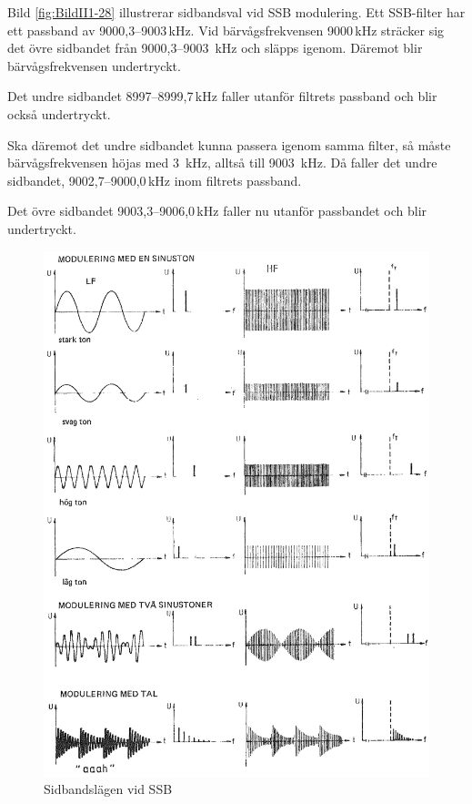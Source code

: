 Bild \ref{fig:BildII1-28} illustrerar sidbandsval vid SSB modulering.
Ett SSB-filter har ett passband av 9000,3--9003\,kHz.
Vid bärvågsfrekvensen 9000\,kHz sträcker sig det övre sidbandet från
9000,3--9003~kHz och släpps igenom.
Däremot blir bärvågsfrekvensen undertryckt.

Det undre sidbandet 8997--8999,7\,kHz faller utanför filtrets passband och blir
också undertryckt.

Ska däremot det undre sidbandet kunna passera igenom samma filter, så måste
bärvågsfrekvensen höjas med 3~kHz, alltså till 9003~kHz.
Då faller det undre sidbandet, 9002,7--9000,0\,kHz inom filtrets passband.

Det övre sidbandet 9003,3--9006,0\,kHz faller nu utanför passbandet och blir
undertryckt.

\begin{figure}
\includegraphics[width=\textwidth]{images/cropped_pdfs/bild_2_1-29.pdf}
\caption{Sidbandslägen vid SSB}
\label{fig:BildII1-29}
\end{figure}

